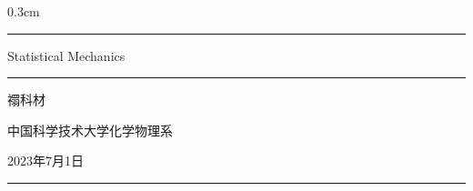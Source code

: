 \documentclass[hyperref,UTF-8]{ctexbook}
\newcommand{\0}{\boldsymbol{0}}
\newcommand{\setparDis}{\setlength{\parskip} {0.3cm} }
\begin{document}
\setparDis

\begin{titlepage}
    \centering


    \rule{\textwidth}{1pt}   %
    \vspace{0.2\textheight}  %


    {\Huge Statistical Mechanics}

    \vspace{0.025\textheight}   %

    \rule{0.83\textwidth}{0.4pt}  %

    \vspace{0.1\textheight}  %


    {\Large \textsc{\kaishu 禤科材}}

    \vspace{0.015\textheight}

    {\Large \textsc{\kaishu 中国科学技术大学\;化学物理系}}

    \vfill  %

    {\large \kaishu 2023年7月1日}
    \vspace{0.1\textheight}  %


    \rule{\textwidth}{1pt}  %

  \end{titlepage}


\nocite{*}

\tableofcontents

\pagebreak
\fontsize{12pt}{16pt}
\end{document}
